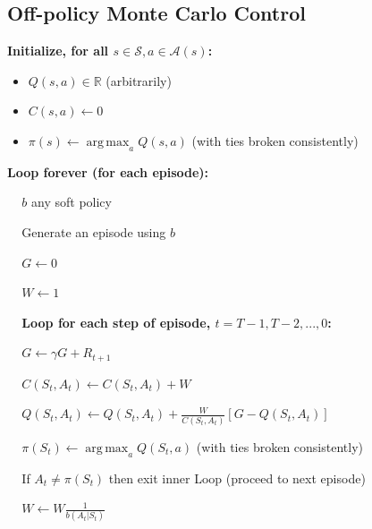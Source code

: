 \documentclass[12pt, a4paper]{article}
\DeclareMathOperator*{\argmax}{arg\,max} %
\begin{document}
\subsection{Off-policy Monte Carlo Control}\label{off-policy-monte-carlo-control}


\begin{tcolorbox}[title={Off-policy MC control for estimating $\pi \approx \pi_*$}]

\textbf{Initialize, for all $s \in \mathcal{S}, a \in \mathcal{A}(s)$:}
\begin{itemize}
 \item $Q(s,a) \in \mathbb{R}$ (arbitrarily)
 \item $C(s,a) \leftarrow 0$
 \item $\pi(s) \leftarrow \argmax_a Q(s,a)$ (with ties broken consistently)
\end{itemize}

\textbf{Loop forever (for each episode):}
\begin{description}
   \item $\;\;\;$ $b$ any soft policy
   \item $\;\;\;$ Generate an episode using $b$
   \item $\;\;\;$ $G \leftarrow 0$
   \item $\;\;\;$ $W \leftarrow 1$
   \item $\;\;\;$ \textbf{Loop for each step of episode, $t=T-1,T-2,...,0$:}
   \begin{description}
     \item $\;\;\;$ $G \leftarrow \gamma G + R_{t+1}$
     \item $\;\;\;$ $C(S_t,A_t) \leftarrow C(S_t,A_t) + W$
     \item $\;\;\;$ $Q(S_t,A_t) \leftarrow Q(S_t,A_t) + \frac{W}{C(S_t,A_t)} [G - Q(S_t,A_t)]$
     \item $\;\;\;$ $\pi(S_t) \leftarrow \argmax_a Q(S_t,a)$ (with ties broken consistently)
     \item $\;\;\;$ If $A_t \neq \pi(S_t)$ then exit inner Loop (proceed to next episode)
     \item $\;\;\;$ $W \leftarrow W\frac{1}{b(A_t | S_t)}$
   \end{description}
\end{description}
\end{tcolorbox}
\end{document}
